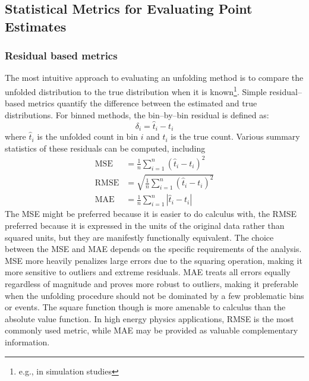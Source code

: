     
    \subsection{Statistical Metrics for Evaluating Point Estimates}
        \subsubsection{Residual based metrics}
            The most intuitive approach to evaluating an unfolding method is to compare the unfolded distribution to the true distribution when it is known\footnote{e.g., in simulation studies}.
            Simple residual--based metrics quantify the difference between the estimated and true distributions.
            For binned methods, the bin--by--bin residual is defined as:
            \begin{equation}
                \delta_i = \hat{t}_i - t_i
            \end{equation}
            where \(\hat{t}_i\) is the unfolded count in bin \(i\) and \(t_i\) is the true count.
            Various summary statistics of these residuals can be computed, including
            \begin{align}
                \text{MSE} &= \frac{1}{n}\sum_{i=1}^{n}(\hat{t}_i - t_i)^2\\
                \text{RMSE} &= \sqrt{\frac{1}{n}\sum_{i=1}^{n}(\hat{t}_i - t_i)^2}\\
                \text{MAE} &= \frac{1}{n}\sum_{i=1}^{n}|\hat{t}_i - t_i|
            \end{align}
            The MSE might be preferred because it is easier to do calculus with, the RMSE preferred because it is expressed in the units of the original data rather than squared units, but they are manifestly functionally equivalent.
            The choice between the MSE and MAE depends on the specific requirements of the analysis.
            MSE more heavily penalizes large errors due to the squaring operation, making it more sensitive to outliers and extreme residuals.
            MAE treats all errors equally regardless of magnitude and proves more robust to outliers, making it preferable when the unfolding procedure should not be dominated by a few problematic bins or events.
            The square function though is more amenable to calculus than the absolute value function.
            In high energy physics applications, RMSE is the most commonly used metric, while MAE may be provided as valuable complementary information.
            
